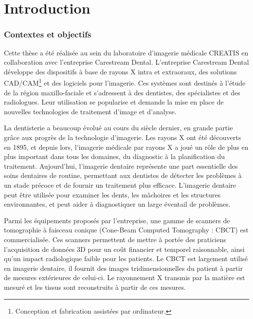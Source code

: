 \chapter*{Introduction}
	\graphicspath{{Introduction/}}
	\label{chap:introduction}

\subsection*{Contextes et objectifs}

Cette thèse a été réalisée au sein du laboratoire d'imagerie médicale CREATIS en collaboration avec l'entreprise Carestream Dental. L'entreprise Carestream Dental développe des dispositifs à base de rayons X intra et extraoraux, des solutions CAD/CAM{\hypersetup{linkcolor=black}\footnote{Conception et fabrication assistées par ordinateur.}} et des logiciels pour l'imagerie. Ces systèmes sont destinés à l'étude de la région maxillo-faciale et s'adressent à des dentistes, des spécialistes et des radiologues.
Leur utilisation se popularise et demande la mise en place de nouvelles technologies de traitement d'image et d'analyse. 

La dentisterie a beaucoup évolué au cours du siècle dernier, en grande partie grâce aux progrès de la technologie d'imagerie. Les rayons X ont été découverts en 1895, et depuis lors, l'imagerie médicale par rayons X a joué un rôle de plus en plus important dans tous les domaines, du diagnostic à la planification du traitement. Aujourd'hui, l'imagerie dentaire représente une part essentielle des soins dentaires de routine, permettant aux dentistes de détecter les problèmes à un stade précoce et de fournir un traitement plus efficace. L'imagerie dentaire peut être utilisée pour examiner les dents, les mâchoires et les structures environnantes, et peut aider à diagnostiquer un large éventail de problèmes. 

Parmi les équipements proposés par l'entreprise, une gamme de scanners de tomographie à faisceau conique (Cone-Beam Computed Tomography : CBCT) est commercialisée. Ces scanners permettent de mettre à portée des praticiens l'acquisition de données 3D pour un coût financier et temporel raisonnable, ainsi qu'un impact radiologique faible pour les patients. Le CBCT est largement utilisé en imagerie dentaire, il fournit des images tridimensionnelles du patient à partir de mesures extérieures de celui-ci. Le rayonnement X transmis par la matière est mesuré et les tissus sont reconstruits à partir de ces mesures.


